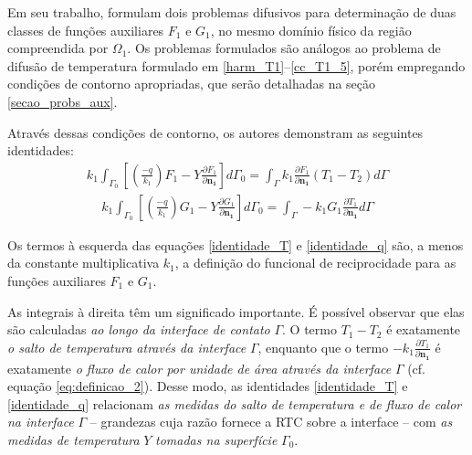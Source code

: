 Em seu trabalho, \cite{reciproc_2} formulam dois problemas difusivos para determinação de duas classes de funções auxiliares $F_1$ e $G_1$, no mesmo domínio físico da região compreendida
por $\Omega_1$. Os problemas formulados são análogos ao problema de difusão de temperatura formulado em \eqref{harm_T1}--\eqref{cc_T1_5}, porém empregando condições de contorno apropriadas, que
serão detalhadas na seção \ref{secao_probs_aux}.

Através dessas condições de contorno, os autores demonstram as seguintes identidades:
\begin{align}
	k_1 \int_{\Gamma_0}\left[\left(\frac{-q}{k_1}\right)F_1 - Y\frac{\partial F_1}{\partial\mathbf{n_1}}\right]d\Gamma_0
	=
	\int_\Gamma k_1 \frac{\partial F_1}{\partial\mathbf{n_1}}\left(T_1 - T_2\right)d\Gamma
	\label{identidade_T}
\end{align}
\begin{align}
	k_1 \int_{\Gamma_0}\left[\left(\frac{-q}{k_1}\right)G_1 - Y\frac{\partial G_1}{\partial\mathbf{n_1}}\right]d\Gamma_0
	=
	\int_\Gamma -k_1 G_1 \frac{\partial T_1}{\partial\mathbf{n_1}}d\Gamma
	\label{identidade_q}
\end{align}

Os termos à esquerda das equações \eqref{identidade_T} e \eqref{identidade_q} são, a menos da constante multiplicativa $k_1$, a definição do funcional de reciprocidade para as 
funções auxiliares $F_1$ e $G_1$.

As integrais à direita têm um significado importante. É possível observar que elas são calculadas \textit{ao longo da interface de contato} $\Gamma$. O termo
$T_1 - T_2$ é exatamente \textit{o salto de temperatura através da interface} $\Gamma$, enquanto que o termo $\displaystyle-k_1 \frac{\partial T_1}{\partial\mathbf{n_1}}$
é exatamente \textit{o fluxo de calor por unidade de área através da interface} $\Gamma$ (cf. equação \eqref{eq:definicao_2}). Desse modo, as identidades \eqref{identidade_T} e \eqref{identidade_q}
relacionam \textit{as medidas
do salto de temperatura e de fluxo de calor na interface} $\Gamma$ -- grandezas cuja razão fornece a RTC sobre a interface -- com \textit{as medidas de temperatura} $Y$ \textit{tomadas na superfície} $\Gamma_0$.

